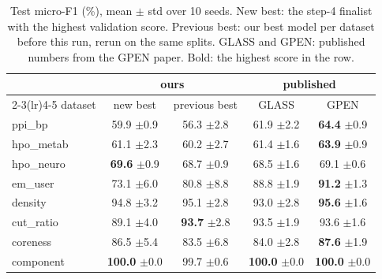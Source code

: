 \documentclass[11pt]{article}
\begin{document}
\begin{table}[H]
\centering
\begin{tabular}{lcc|cc}
\toprule
 & \multicolumn{2}{c|}{ours} & \multicolumn{2}{c}{published} \\
\cmidrule(lr){2-3}\cmidrule(lr){4-5}
dataset & new best & previous best & GLASS & GPEN \\
\midrule
ppi\_bp & 59.9 {\scriptsize $\pm$0.9} & 56.3 {\scriptsize $\pm$2.8} & 61.9 {\scriptsize $\pm$2.2} & \textbf{64.4} {\scriptsize $\pm$0.9} \\
hpo\_metab & 61.1 {\scriptsize $\pm$2.3} & 60.2 {\scriptsize $\pm$2.7} & 61.4 {\scriptsize $\pm$1.6} & \textbf{63.9} {\scriptsize $\pm$0.9} \\
hpo\_neuro & \textbf{69.6} {\scriptsize $\pm$0.9} & 68.7 {\scriptsize $\pm$0.9} & 68.5 {\scriptsize $\pm$1.6} & 69.1 {\scriptsize $\pm$0.6} \\
em\_user & 73.1 {\scriptsize $\pm$6.0} & 80.8 {\scriptsize $\pm$8.8} & 88.8 {\scriptsize $\pm$1.9} & \textbf{91.2} {\scriptsize $\pm$1.3} \\
density & 94.8 {\scriptsize $\pm$3.2} & 95.1 {\scriptsize $\pm$2.8} & 93.0 {\scriptsize $\pm$2.8} & \textbf{95.6} {\scriptsize $\pm$1.6} \\
cut\_ratio & 89.1 {\scriptsize $\pm$4.0} & \textbf{93.7} {\scriptsize $\pm$2.8} & 93.5 {\scriptsize $\pm$1.9} & 93.6 {\scriptsize $\pm$1.6} \\
coreness & 86.5 {\scriptsize $\pm$5.4} & 83.5 {\scriptsize $\pm$6.8} & 84.0 {\scriptsize $\pm$2.8} & \textbf{87.6} {\scriptsize $\pm$1.9} \\
component & \textbf{100.0} {\scriptsize $\pm$0.0} & 99.7 {\scriptsize $\pm$0.6} & \textbf{100.0} {\scriptsize $\pm$0.0} & \textbf{100.0} {\scriptsize $\pm$0.0} \\
\bottomrule
\end{tabular}
\caption{Test micro-F1 (\%), mean $\pm$ std over 10 seeds. New best: the step-4 finalist with
the highest validation score. Previous best: our best model per dataset before this run, rerun on
the same splits. GLASS and GPEN: published numbers from the GPEN paper. Bold: the highest score in the row.}
\end{table}
\end{document}
